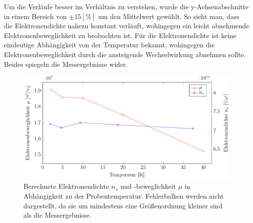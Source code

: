 Um die Verläufe besser im Verhältnis zu verstehen, wurde die y-Achsenabschnitte in einem Bereich von $\pm \unit{15}[\%] $ um den Mittelwert gewählt. So sieht man, dass die Elektronendichte nahezu konstant verläuft, wohingegen ein leicht abnehmende Elektronenbeweglichkeit zu beobachten ist. Für die Elektronendichte ist keine eindeutige Abhängigkeit von der Temperatur bekannt, wohingegen die Elektronenbeweglichkeit durch die ansteigende Wechselwirkung abnehmen sollte. Beides spiegeln die Messergebnisse wider.

\begin{figure}[h]
	\centering
	\includegraphics[scale=1]{graphs/temperatur/auswertung.pdf}
	\caption[Auswertung der Temperaturvariation]{
		Berechnete Elektronendichte $n_s$ und -beweglichkeit $\mu$ in Abhängigkeit zu der Probentemperatur. Fehlerbalken werden nicht dargestellt, da sie um mindestens eine Größenordnung kleiner sind als die Messergebnisse.
	}
	\label{fig:temp_ausw}
\end{figure}

